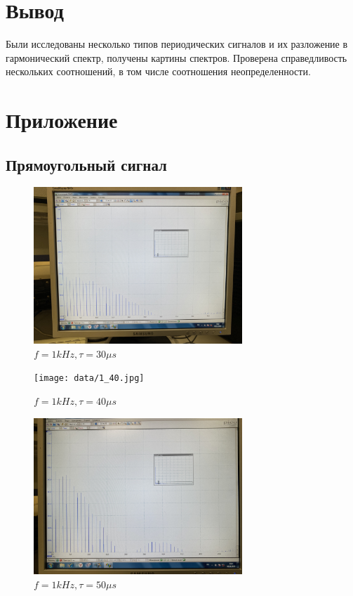 \documentclass[a4paper, 12pt]{article}
\begin{document}
\section{Вывод}
Были исследованы несколько типов периодических сигналов и их разложение в гармонический спектр, получены картины спектров. Проверена справедливость нескольких соотношений, в том числе соотношения неопределенности.
\section{Приложение}
\subsection*{Прямоугольный сигнал}
\begin{figure}[H]
    \centering
    \includegraphics[width=0.7\textwidth]{data/1_30.jpg}
    \caption{$f = 1 kHz, \tau = 30 \mu s$}
    \label{fig:data/1_30.jpg}
\end{figure}
\begin{figure}[H]
    \centering
    \texttt{[image: data/1\_40.jpg]}
    \caption{$f = 1 kHz, \tau = 40 \mu s$}
    \label{fig:data/1_40.jpg}
\end{figure}
\begin{figure}[H]
    \centering
    \includegraphics[width=0.7\textwidth]{data/1_50.jpg}
    \caption{$f = 1 kHz, \tau = 50 \mu s$}
    \label{fig:data/1_50.jpg}
\end{figure}
\end{document}
